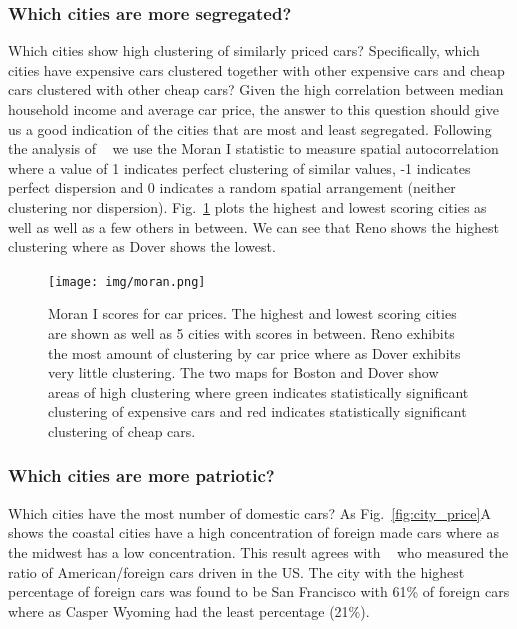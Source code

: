 \documentclass[10pt,twocolumn,letterpaper]{article}
\begin{document}
\subsubsection{Which cities are more segregated?}
Which cities show high clustering of similarly priced cars? Specifically, which cities have expensive cars clustered together with other expensive cars and cheap cars clustered with other cheap cars? Given the high correlation between median household income and average car price, the answer to this question should give us a good indication of the cities that are most and least segregated. Following the analysis of ~\cite{mit_plos_1} we use the Moran I statistic to measure spatial autocorrelation where a value of 1 indicates perfect clustering of similar values, -1 indicates perfect dispersion and 0 indicates a random spatial arrangement (neither clustering nor dispersion). Fig.~\ref{fig:moran-i} plots the highest and lowest scoring cities as well as well as a few others in between. We can see that Reno shows the highest clustering where as Dover shows the lowest.

\begin{figure}[t]
\begin{center}
    \texttt{[image: img/moran.png]}
\end{center}
   \caption {Moran I scores for car prices. The highest and lowest scoring cities are shown as well as 5 cities with scores in between. Reno exhibits the most amount of clustering by car price where as Dover exhibits very little clustering. The two maps for Boston and Dover show areas of high clustering where green indicates statistically significant clustering of expensive cars and red indicates statistically significant clustering of cheap cars.} 
\label{fig:moran-i}
\end{figure}

\subsubsection{Which cities are more patriotic?}
Which cities have the most number of domestic cars? As Fig.~\ref{fig:city_price}A shows the coastal cities have a high concentration of foreign made cars where as the midwest has a low concentration. This result agrees with ~\cite{foreign_domestic} who measured the ratio of American/foreign cars driven in the US. The city with the highest percentage of foreign cars was found to be San Francisco with 61\% of foreign cars where as Casper Wyoming had the least percentage (21\%).
\end{document}
